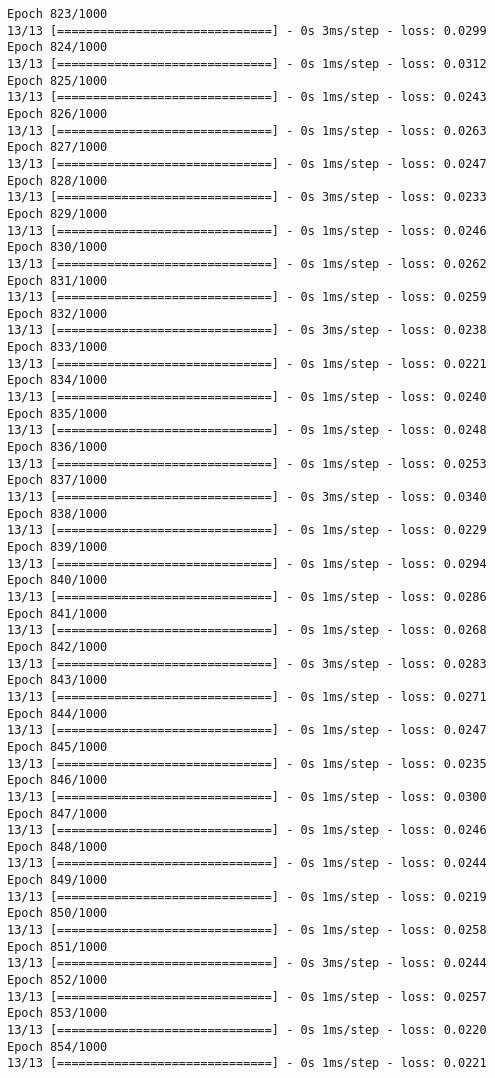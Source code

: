 \documentclass[11pt]{article}
\begin{document}
\begin{Verbatim}[commandchars=\\\{\}]
Epoch 823/1000
13/13 [==============================] - 0s 3ms/step - loss: 0.0299
Epoch 824/1000
13/13 [==============================] - 0s 1ms/step - loss: 0.0312
Epoch 825/1000
13/13 [==============================] - 0s 1ms/step - loss: 0.0243
Epoch 826/1000
13/13 [==============================] - 0s 1ms/step - loss: 0.0263
Epoch 827/1000
13/13 [==============================] - 0s 1ms/step - loss: 0.0247
Epoch 828/1000
13/13 [==============================] - 0s 3ms/step - loss: 0.0233
Epoch 829/1000
13/13 [==============================] - 0s 1ms/step - loss: 0.0246
Epoch 830/1000
13/13 [==============================] - 0s 1ms/step - loss: 0.0262
Epoch 831/1000
13/13 [==============================] - 0s 1ms/step - loss: 0.0259
Epoch 832/1000
13/13 [==============================] - 0s 3ms/step - loss: 0.0238
Epoch 833/1000
13/13 [==============================] - 0s 1ms/step - loss: 0.0221
Epoch 834/1000
13/13 [==============================] - 0s 1ms/step - loss: 0.0240
Epoch 835/1000
13/13 [==============================] - 0s 1ms/step - loss: 0.0248
Epoch 836/1000
13/13 [==============================] - 0s 1ms/step - loss: 0.0253
Epoch 837/1000
13/13 [==============================] - 0s 3ms/step - loss: 0.0340
Epoch 838/1000
13/13 [==============================] - 0s 1ms/step - loss: 0.0229
Epoch 839/1000
13/13 [==============================] - 0s 1ms/step - loss: 0.0294
Epoch 840/1000
13/13 [==============================] - 0s 1ms/step - loss: 0.0286
Epoch 841/1000
13/13 [==============================] - 0s 1ms/step - loss: 0.0268
Epoch 842/1000
13/13 [==============================] - 0s 3ms/step - loss: 0.0283
Epoch 843/1000
13/13 [==============================] - 0s 1ms/step - loss: 0.0271
Epoch 844/1000
13/13 [==============================] - 0s 1ms/step - loss: 0.0247
Epoch 845/1000
13/13 [==============================] - 0s 1ms/step - loss: 0.0235
Epoch 846/1000
13/13 [==============================] - 0s 1ms/step - loss: 0.0300
Epoch 847/1000
13/13 [==============================] - 0s 1ms/step - loss: 0.0246
Epoch 848/1000
13/13 [==============================] - 0s 1ms/step - loss: 0.0244
Epoch 849/1000
13/13 [==============================] - 0s 1ms/step - loss: 0.0219
Epoch 850/1000
13/13 [==============================] - 0s 1ms/step - loss: 0.0258
Epoch 851/1000
13/13 [==============================] - 0s 3ms/step - loss: 0.0244
Epoch 852/1000
13/13 [==============================] - 0s 1ms/step - loss: 0.0257
Epoch 853/1000
13/13 [==============================] - 0s 1ms/step - loss: 0.0220
Epoch 854/1000
13/13 [==============================] - 0s 1ms/step - loss: 0.0221

\end{Verbatim}
\end{document}
